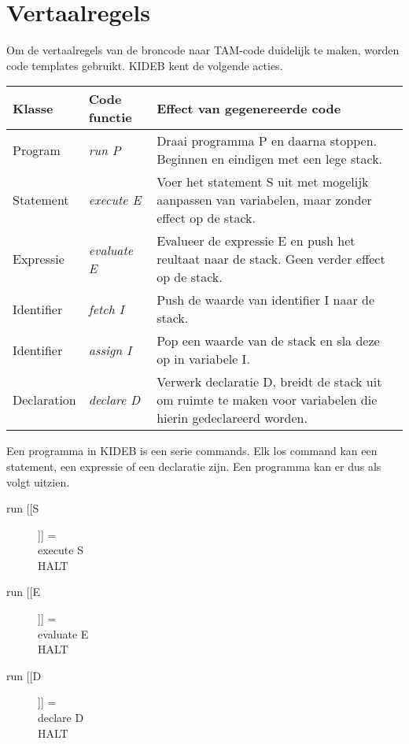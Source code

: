 \chapter{Vertaalregels} %
\label{cha:vertaalregels}
Om de vertaalregels van de broncode naar TAM-code duidelijk te maken, worden code templates gebruikt. KIDEB kent de volgende acties.

\begin{tabular}{| l | l | p{6 cm} |}
    \hline
    Klasse & Code functie & Effect van gegenereerde code \\
    \hline
    Program & \emph{run P} & Draai programma P en daarna stoppen. Beginnen en eindigen met een lege stack. \\
    \hline
    Statement & \emph{execute E} & Voer het statement S uit met mogelijk aanpassen van variabelen, maar zonder effect op de stack. \\
    \hline
    Expressie & \emph{evaluate E} & Evalueer de expressie E en push het reultaat naar de stack. Geen verder effect op de stack. \\
    \hline
    Identifier & \emph{fetch I} & Push de waarde van identifier I naar de stack. \\
    \hline
    Identifier & \emph{assign I} & Pop een waarde van de stack en sla deze op in variabele I. \\
    \hline
    Declaration & \emph{declare D} & Verwerk declaratie D, breidt de stack uit om ruimte te maken voor variabelen die hierin gedeclareerd worden. \\
    \hline
\end{tabular} 

Een programma in KIDEB is een serie commands. Elk los command kan een statement, een expressie of een declaratie zijn. Een programma kan er dus als volgt uitzien.
\begin{description}
    \item[run [[S]]] = \hfill \\
        execute S \\
        HALT
    \item[run [[E]]] = \hfill \\
        evaluate E \\
        HALT
    \item[run [[D]]] = \hfill \\
        declare D \\
        HALT
\end{description}
\clearpage